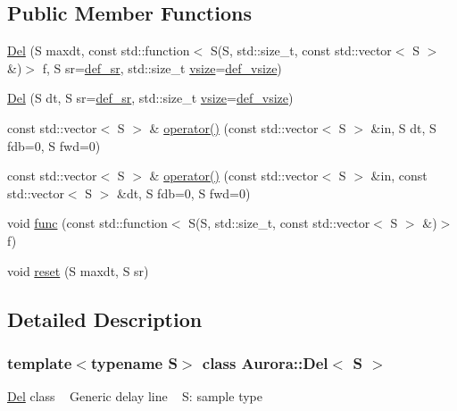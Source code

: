 \subsection*{Public Member Functions}
\begin{DoxyCompactItemize}
\item 
\hyperlink{class_aurora_1_1_del_ad2236892c8f3459010f7570bee8275a1}{Del} (S maxdt, const std\+::function$<$ S(S, std\+::size\+\_\+t, const std\+::vector$<$ S $>$ \&)$>$ f, S sr=\hyperlink{namespace_aurora_ad49263d809bea98dd422e95bc91bc03e}{def\+\_\+sr}, std\+::size\+\_\+t \hyperlink{class_aurora_1_1_snd_base_af9e21aaf411b17f7a8221c991ce5d291}{vsize}=\hyperlink{namespace_aurora_afaaddf667a06e7ce23c667a8b7295263}{def\+\_\+vsize})
\item 
\hyperlink{class_aurora_1_1_del_ae7ee559e909a215a6d8248d9c9a0ced8}{Del} (S dt, S sr=\hyperlink{namespace_aurora_ad49263d809bea98dd422e95bc91bc03e}{def\+\_\+sr}, std\+::size\+\_\+t \hyperlink{class_aurora_1_1_snd_base_af9e21aaf411b17f7a8221c991ce5d291}{vsize}=\hyperlink{namespace_aurora_afaaddf667a06e7ce23c667a8b7295263}{def\+\_\+vsize})
\item 
const std\+::vector$<$ S $>$ \& \hyperlink{class_aurora_1_1_del_a7061e3fc28fa7c9cace2f194c0c2933b}{operator()} (const std\+::vector$<$ S $>$ \&in, S dt, S fdb=0, S fwd=0)
\item 
const std\+::vector$<$ S $>$ \& \hyperlink{class_aurora_1_1_del_a7b07356cf07e48791929e7c99c907650}{operator()} (const std\+::vector$<$ S $>$ \&in, const std\+::vector$<$ S $>$ \&dt, S fdb=0, S fwd=0)
\item 
void \hyperlink{class_aurora_1_1_del_aeaf2a09c658c57e3e29793ea8af092d3}{func} (const std\+::function$<$ S(S, std\+::size\+\_\+t, const std\+::vector$<$ S $>$ \&)$>$ f)
\item 
void \hyperlink{class_aurora_1_1_del_a1d5f6aa043e47077b3c1654d884c77f1}{reset} (S maxdt, S sr)
\end{DoxyCompactItemize}


\subsection{Detailed Description}
\subsubsection*{template$<$typename S$>$\newline
class Aurora\+::\+Del$<$ S $>$}

\hyperlink{class_aurora_1_1_del}{Del} class ~\newline
Generic delay line ~\newline
S\+: sample type 

